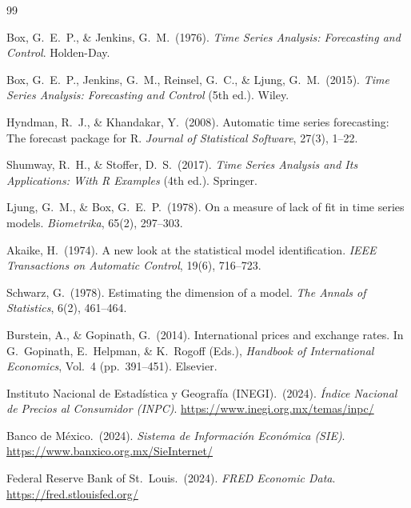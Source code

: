 \documentclass[12pt,a4paper]{article}
\begin{document}
\begin{thebibliography}{99}

Box, G.\ E.\ P., \& Jenkins, G.\ M.\ (1976).
\textit{Time Series Analysis: Forecasting and Control}.
Holden-Day.

Box, G.\ E.\ P., Jenkins, G.\ M., Reinsel, G.\ C., \& Ljung, G.\ M.\ (2015).
\textit{Time Series Analysis: Forecasting and Control} (5th ed.).
Wiley.

Hyndman, R.\ J., \& Khandakar, Y.\ (2008).
Automatic time series forecasting: The forecast package for R.
\textit{Journal of Statistical Software}, 27(3), 1–22.

Shumway, R.\ H., \& Stoffer, D.\ S.\ (2017).
\textit{Time Series Analysis and Its Applications: With R Examples} (4th ed.).
Springer.

Ljung, G.\ M., \& Box, G.\ E.\ P.\ (1978).
On a measure of lack of fit in time series models.
\textit{Biometrika}, 65(2), 297–303.

Akaike, H.\ (1974).
A new look at the statistical model identification.
\textit{IEEE Transactions on Automatic Control}, 19(6), 716–723.

Schwarz, G.\ (1978).
Estimating the dimension of a model.
\textit{The Annals of Statistics}, 6(2), 461–464.

Burstein, A., \& Gopinath, G.\ (2014).
International prices and exchange rates.
In G.\ Gopinath, E.\ Helpman, \& K.\ Rogoff (Eds.),
\textit{Handbook of International Economics}, Vol.\ 4 (pp.\ 391–451).
Elsevier.

Instituto Nacional de Estadística y Geografía (INEGI).\ (2024).
\textit{Índice Nacional de Precios al Consumidor (INPC)}.
\url{https://www.inegi.org.mx/temas/inpc/}

Banco de México.\ (2024).
\textit{Sistema de Información Económica (SIE)}.
\url{https://www.banxico.org.mx/SieInternet/}

Federal Reserve Bank of St.\ Louis.\ (2024).
\textit{FRED Economic Data}.
\url{https://fred.stlouisfed.org/}

\end{thebibliography}
\end{document}
